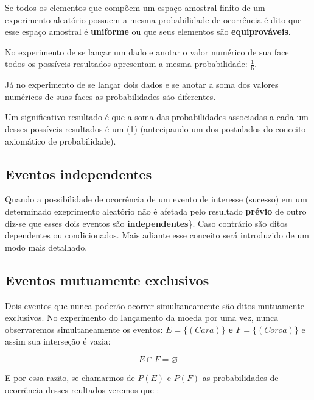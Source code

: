 \documentclass[
]{book}
\begin{document}
Se todos os elementos que compõem um espaço amostral finito de um experimento aleatório possuem a mesma probabilidade de ocorrência é dito que esse espaço amostral é \textbf{uniforme} ou que seus elementos são \textbf{equiprováveis}.

\hfill\break

No experimento de se lançar um dado e anotar o valor numérico de sua face todos os possíveis resultados apresentam a mesma probabilidade: \(\frac{1}{6}\).

\hfill\break

Já no experimento de se lançar dois dados e se anotar a soma dos valores numéricos de suas faces as probabilidades são diferentes.

\hfill\break

Um significativo resultado é que a soma das probabilidades associadas a cada um desses possíveis resultados é um (1) (antecipando um dos postulados do conceito axiomático de probabilidade).

\hypertarget{eventos-independentes}{%
\subsection{Eventos independentes}\label{eventos-independentes}}

Quando a possibilidade de ocorrência de um evento de interesse (sucesso) em um determinado exeprimento aleatório não é afetada pelo resultado \textbf{prévio} de outro diz-se que esses dois eventos são \textbf{independentes}\}. Caso contrário são ditos dependentes ou condicionados. Mais adiante esse conceito será introduzido de um modo mais detalhado.

\hypertarget{eventos-mutuamente-exclusivos}{%
\subsection{Eventos mutuamente exclusivos}\label{eventos-mutuamente-exclusivos}}

Dois eventos que nunca poderão ocorrer simultaneamente são ditos mutuamente exclusivos. No experimento do lançamento da moeda por uma vez, nunca observaremos simultaneamente os eventos: \(E=\{(Cara)\}\) \textbf{e} \(F=\{(Coroa)\}\) e assim sua interseção é vazia:

\hfill\break

\[
E \cap F = \varnothing 
\]

\hfill\break

E por essa razão, se chamarmos de \(P(E)\) e \(P(F)\) as probabilidades de ocorrência desses reultados veremos que :
\end{document}
